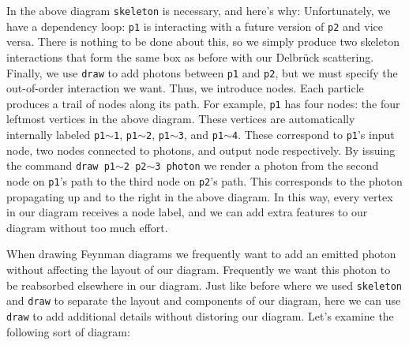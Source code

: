 \documentclass[12pt]{article}
\begin{document}
In the above diagram \texttt{skeleton} is necessary, and here's why:
Unfortunately, we have a dependency loop: \texttt{p1} is interacting with a future version of \texttt{p2} and vice versa.
There is nothing to be done about this, so we simply produce two skeleton interactions that form the same box as before with our Delbr\"uck scattering.
Finally, we use \texttt{draw} to add photons between \texttt{p1} and \texttt{p2}, but we must specify the out-of-order interaction we want.
Thus, we introduce nodes.
Each particle produces a trail of nodes along its path.
For example, \texttt{p1} has four nodes: the four leftmost vertices in the above diagram.
These vertices are automatically internally labeled \texttt{p1$\sim$1}, \texttt{p1$\sim$2}, \texttt{p1$\sim$3}, and \texttt{p1$\sim$4}.
These correspond to \texttt{p1}'s input node, two nodes connected to photons, and output node respectively.
By issuing the command \texttt{draw p1$\sim$2 p2$\sim$3 photon} we render a photon from the second node on \texttt{p1}'s path to the third node on \texttt{p2}'s path.
This corresponds to the photon propagating up and to the right in the above diagram.
In this way, every vertex in our diagram receives a node label, and we can add extra features to our diagram without too much effort.

\newpage
When drawing Feynman diagrams we frequently want to add an emitted photon without affecting the layout of our diagram.
Frequently we want this photon to be reabsorbed elsewhere in our diagram.
Just like before where we used \texttt{skeleton} and \texttt{draw} to separate the layout and components of our diagram, here we can use \texttt{draw} to add additional details without distoring our diagram.
Let's examine the following sort of diagram:
\end{document}
